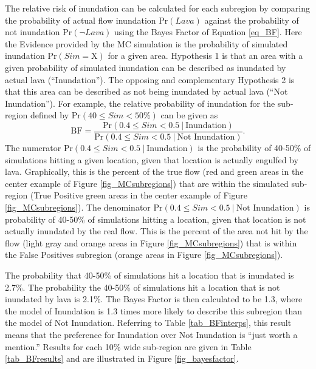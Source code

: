 		The relative risk of inundation can be calculated for each subregion by comparing the probability of actual flow inundation $\text{Pr}(Lava)$ against the probability of not inundation $\text{Pr}(\neg Lava)$ using the Bayes Factor of Equation \ref{eq_BF}. Here the Evidence provided by the MC simulation is the probability of simulated inundation $\text{Pr}(Sim=\text{X})$ for a given area. Hypothesis 1 is that an area with a given probability of simulated inundation can be described as inundated by actual lava (``Inundation''). The opposing and complementary Hypothesis 2 is that this area can be described as not being inundated by actual lava (``Not Inundation''). For example, the relative probability of inundation for the sub-region defined by $\text{Pr}(40\le Sim<50\%)$ can be given as
		\begin{equation}
			\text{BF} = \frac{\text{Pr}(0.4\le Sim<0.5~|~\text{Inundation})}{\text{Pr}(0.4\le Sim<0.5~|~\text{Not~Inundation})}.
		\end{equation}
		The numerator $\text{Pr}(0.4\le Sim<0.5~|~\text{Inundation})$ is the probability of 40-50\% of simulations hitting a given location, given that location is actually engulfed by lava. Graphically, this is the percent of the true flow (red and green areas in the center example of Figure \ref{fig_MCsubregions}) that are within the simulated sub-region (True Positive green areas in the center example of Figure \ref{fig_MCsubregions}). The denominator $\text{Pr}(0.4\le Sim<0.5~|~\text{Not Inundation})$ is probability of 40-50\% of simulations hitting a location, given that location is not actually inundated by the real flow. This is the percent of the area not hit by the flow (light gray and orange areas in Figure \ref{fig_MCsubregions}) that is within the False Positives subregion (orange areas in Figure \ref{fig_MCsubregions}). 
		
		The probability that 40-50\% of simulations hit a location that is inundated is 2.7\%. The probability the 40-50\% of simulations hit a location that is not inundated by lava is 2.1\%. The Bayes Factor is then calculated to be 1.3, where the model of Inundation is 1.3 times more likely to describe this subregion than the model of Not Inundation. Referring to Table \ref{tab_BFinterps}, this result means that the preference for Inundation over Not Inundation is ``just worth a mention.'' Results for each 10\% wide sub-region are given in Table \ref{tab_BFresults} and are illustrated in Figure \ref{fig_bayesfactor}.
		


